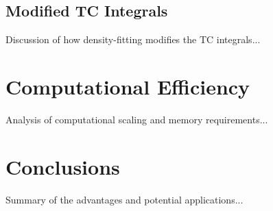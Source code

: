 \documentclass[12pt]{article}
\begin{document}
\subsection{Modified TC Integrals}
Discussion of how density-fitting modifies the TC integrals...

\section{Computational Efficiency}
Analysis of computational scaling and memory requirements...

\section{Conclusions}
Summary of the advantages and potential applications...



\end{document}
